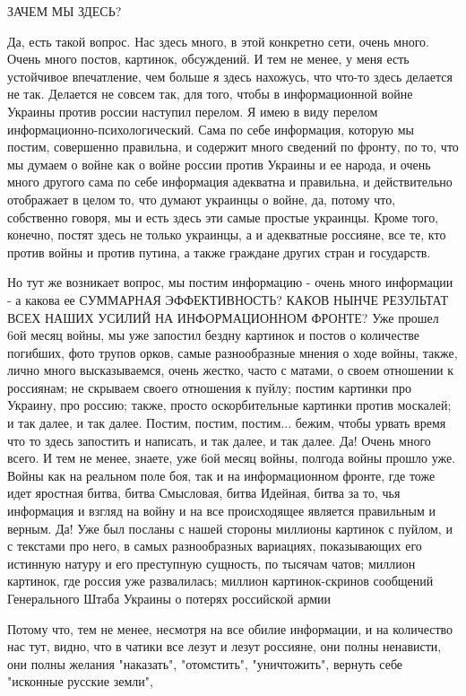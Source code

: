  
 
 
 
 

ЗАЧЕМ МЫ ЗДЕСЬ?

Да, есть такой вопрос. Нас здесь много, в этой конкретно сети, очень много.
Очень много постов, картинок, обсуждений. И тем не менее, у меня есть
устойчивое впечатление, чем больше я здесь нахожусь, что что-то здесь делается
не так. Делается не совсем так, для того, чтобы в информационной войне Украины
против россии наступил перелом.  Я имею в виду перелом
информационно-психологический. Сама по себе информация, которую мы постим,
совершенно правильна, и содержит много сведений по фронту, по то, что мы думаем
о войне как о войне россии против Украины и ее народа, и очень много другого
сама по себе информация адекватна и правильна, и действительно отображает в
целом то, что думают украинцы о войне, да, потому что, собственно говоря, мы и
есть здесь эти самые простые украинцы. Кроме того, конечно, постят здесь не
только украинцы, а и адекватные россияне, все те, кто против войны и против
путина, а также граждане других стран и государств.

Но тут же возникает вопрос, мы постим информацию - очень много информации - а
какова ее СУММАРНАЯ ЭФФЕКТИВНОСТЬ? КАКОВ НЫНЧЕ РЕЗУЛЬТАТ ВСЕХ НАШИХ УСИЛИЙ НА
ИНФОРМАЦИОННОМ ФРОНТЕ?  Уже прошел 6ой месяц войны, мы уже запостил бездну
картинок и постов о количестве погибших, фото трупов орков, самые разнообразные
мнения о ходе войны, также, лично много высказываемся, очень жестко, часто с
матами, о своем отношении к россиянам;  не скрываем своего отношения к пуйлу;
постим картинки про Украину, про россию; также, просто оскорбительные картинки
против москалей; и так далее, и так далее.  Постим, постим, постим... бежим,
чтобы урвать время что то здесь запостить и написать, и так далее, и так далее.
Да! Очень много всего. И тем не менее, знаете, уже 6ой месяц войны, полгода
войны прошло уже. Войны как на реальном поле боя, так и на информационном
фронте, где тоже идет яростная битва, битва Смысловая, битва Идейная, битва за
то, чья информация и взгляд на войну и на все происходящее является правильным
и верным. Да! Уже был посланы с нашей стороны миллионы картинок с пуйлом, и с
текстами про него, в самых разнообразных вариациях, показывающих его истинную
натуру и его преступную сущность, по тысячам чатов; миллион картинок, где
россия уже развалилась; миллион картинок-скринов сообщений Генерального Штаба
Украины о потерях российской армии


Потому что, тем не менее, несмотря на все обилие информации, и на количество
нас тут, видно, что в чатики все лезут и лезут россияне, они полны ненависти,
они полны желания "наказать", "отомстить", "уничтожить", вернуть себе
"исконные русские земли",
